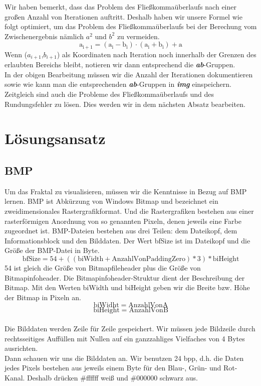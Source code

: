 \documentclass[course=erap]{aspdoc}
\begin{document}
Wir haben bemerkt, dass das Problem des Fließkommaüberlaufs nach einer großen Anzahl von Iterationen auftritt. Deshalb haben wir unsere Formel wie folgt optimiert, um das Problem des Fließkommaüberlaufs bei der Berechung vom Zwischenergebnis nämlich \textbf{\emph{$a^2$}} und \textbf{\emph{$b^2$}} zu vermeiden.
\begin{equation}\mathrm{a_{i+1}}= (\mathrm{a_{i}}-\mathrm{b_{i}}) \cdot (\mathrm{a_{i}}+\mathrm{b_{i}})+\mathrm{a}\end{equation}
Wenn (\textbf{\emph{$a_{i+1}$}},\textbf{\emph{$b_{i+1}$}}) als Koordinaten nach Iteration noch innerhalb der Grenzen des erlaubten Bereichs bleibt, notieren wir dann entsprechend die \textbf{\emph{ab}}-Gruppen.
\\In der obigen Bearbeitung müssen wir die Anzahl der Iterationen dokumentieren sowie wie kann man die entsprechenden \emph{\textbf{ab}}-Gruppen in \textbf{\emph{img}} einspeichern. Zeitgleich sind auch die Probleme des Fließkommaüberlaufs und des Rundungsfehler zu lösen. Dies werden wir in dem nächsten Absatz bearbeiten.


\section{Lösungsansatz}

 \subsection{BMP}
 Um das Fraktal zu visualisieren, müssen wir die Kenntnisse in Bezug auf BMP lernen. BMP ist Abkürzung von Windows Bitmap und bezeichnet ein zweidimensionales Rastergrafikformat.\cite{ wiki:BMP}  Und die Rastergrafiken bestehen aus einer rasterförmigen Anordnung von so genannten Pixeln, denen jeweils eine Farbe zugeordnet ist.\cite{ wiki:Rastergrafik} BMP-Dateien bestehen aus drei Teilen: dem Dateikopf, dem Informationsblock und den Bilddaten. Der Wert bfSize ist im Dateikopf und die Größe der BMP-Datei in Byte.
 \begin{equation}
 \mathrm{bfSize}=54+((\mathrm{biWidth}+\mathrm{AnzahlVonPaddingZero})*3)*\mathrm{biHeight}
 \end{equation}
 54 ist gleich die Größe von Bitmapfileheader plus die Größe von Bitmapinfoheader. Die Bitmapinfoheader-Struktur dient der Beschreibung der Bitmap. Mit den Werten biWidth und biHeight geben wir die Breite bzw. Höhe der Bitmap in Pixeln an.\begin{equation}\mathrm{biWidht}= \mathrm{AnzahlVonA}\end{equation}  \begin{equation} \mathrm{biHeight}= \mathrm{AnzahlVonB}\end{equation}
\\Die Bilddaten werden Zeile für Zeile gespeichert. Wir müssen jede Bildzeile durch rechtsseitiges Auffüllen mit Nullen auf ein ganzzahliges Vielfaches von 4 Bytes ausrichten.
\\Dann schauen wir uns die Bilddaten an. Wir benutzen 24 bpp,\cite{ wiki:BMP} d.h. die Daten jedes Pixels bestehen aus jeweils einem Byte für den Blau-, Grün- und Rot-Kanal. Deshalb drücken  \#ffffff weiß und \#000000 schwarz aus.
\end{document}
